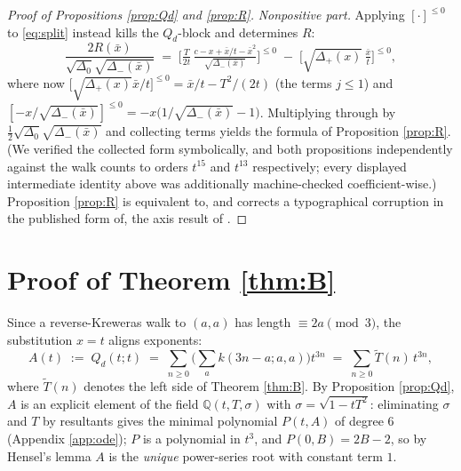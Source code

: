 \documentclass[11pt]{article}
\newcommand{\bx}{\bar x}\newcommand{\by}{\bar y}
\begin{document}
\begin{proof}[Proof of Propositions \ref{prop:Qd} and \ref{prop:R}]
\emph{Nonpositive part.} Applying $[\cdot]^{\le0}$ to \eqref{eq:split} instead kills the $Q_d$-block and determines $R$:
\[ \frac{2R(\bx)}{\sqrt{\Delta_0}\sqrt{\Delta_-(\bx)}} \;=\; \Big[\tfrac{T}{2t}\,\tfrac{c - x + \bx/t - \bx^{2}}{\sqrt{\Delta_-(\bx)}}\Big]^{\le0} \;-\; \Big[\sqrt{\Delta_+(x)}\,\tfrac{\bx}{t}\Big]^{\le0}, \]
where now $\big[\sqrt{\Delta_+(x)}\bx/t\big]^{\le0} = \bx/t - T^2/(2t)$ (the terms $j\le1$) and $[-x/\sqrt{\Delta_-(\bx)}]^{\le0} = -x\big(1/\sqrt{\Delta_-(\bx)}-1\big)$. Multiplying through by $\tfrac12\sqrt{\Delta_0}\sqrt{\Delta_-(\bx)}$ and collecting terms yields the formula of Proposition \ref{prop:R}. (We verified the collected form symbolically, and both propositions independently against the walk counts to orders $t^{15}$ and $t^{13}$ respectively; every displayed intermediate identity above was additionally machine-checked coefficient-wise.) Proposition \ref{prop:R} is equivalent to, and corrects a typographical corruption in the published form of, the axis result of \cite{Mishna}.
\end{proof}

\section{Proof of Theorem \ref{thm:B}}\label{sec:lemB}
Since a reverse-Kreweras walk to $(a,a)$ has length $\equiv 2a \pmod 3$, the substitution $x=t$ aligns exponents: 
\[ A(t) \;:=\; Q_d(t;t) \;=\; \sum_{n\ge0}\Big(\sum_{a} k(3n-a;a,a)\Big)t^{3n} \;=\; \sum_{n\ge0}\widetilde T(n)\,t^{3n}, \]
where $\widetilde T(n)$ denotes the left side of Theorem \ref{thm:B}. By Proposition \ref{prop:Qd}, $A$ is an explicit element of the field $\mathbb{Q}(t,T,\sigma)$ with $\sigma = \sqrt{1-tT^2}$: eliminating $\sigma$ and $T$ by resultants gives the minimal polynomial $P(t,A)$ of degree $6$ (Appendix \ref{app:ode}); $P$ is a polynomial in $t^3$, and $P(0,B) = 2B-2$, so by Hensel's lemma $A$ is the \emph{unique} power-series root with constant term $1$.
\end{document}
